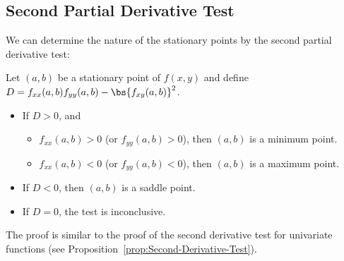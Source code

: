 \subsection{Second Partial Derivative Test}

We can determine the nature of the stationary points by the second partial derivative test:

\begin{proposition}
    Let $(a, b)$ be a stationary point of $f(x, y)$ and define $D = f_{xx}(a, b) f_{yy}(a,b) - \bs{f_{xy}(a, b)}^2$.
    \begin{itemize}
        \item If $D > 0$, and
        \begin{itemize}
            \item $f_{xx}(a, b) > 0$ (or $f_{yy} (a, b) > 0$), then $(a, b)$ is a minimum point.
            \item $f_{xx}(a, b) < 0$ (or $f_{yy} (a, b) < 0$), then $(a, b)$ is a maximum point.
        \end{itemize}
        \item If $D < 0$, then $(a, b)$ is a saddle point.
        \item If $D = 0$, the test is inconclusive.
    \end{itemize}
\end{proposition}
The proof is similar to the proof of the second derivative test for univariate functions (see Proposition~\ref{prop:Second-Derivative-Test}).
